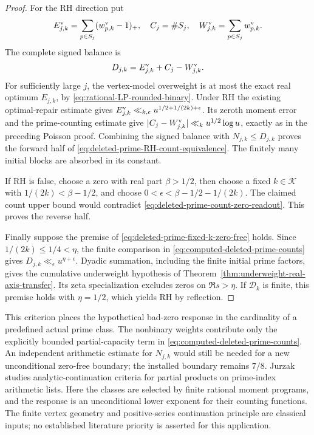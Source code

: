 \documentclass[11pt]{article}
\theoremstyle{definition}
\begin{document}
\begin{proof}
For the RH direction put
\[
 E^{\rm v}_{j,k}
       =\sum_{p\in S_j}(w^{\rm v}_{p,k}-1)_+,\quad
 C_j=\#S_j,\quad W^{\rm v}_{j,k}=\sum_{p\in S_j}w^{\rm v}_{p,k}.
\]
The complete signed balance is
\begin{equation}
 D_{j,k}=E^{\rm v}_{j,k}+C_j-W^{\rm v}_{j,k}.
 \label{eq:deleted-prime-signed-forward-ledger}
\end{equation}
For sufficiently large $j$, the vertex-model overweight
is at most the exact real optimum $E_{j,k}$, by
\eqref{eq:rational-LP-rounded-binary}.
Under RH the existing optimal-repair estimate gives
$E^{\rm v}_{j,k}\ll_{k,\epsilon}u^{1/2+1/(2k)+\epsilon}$.
Its zeroth moment error and the prime-counting estimate
give $|C_j-W^{\rm v}_{j,k}|\ll_k u^{1/2}\log u$, exactly
as in the preceding Poisson proof.
Combining the signed balance with $N_{j,k}\le D_{j,k}$
proves the forward half of
\eqref{eq:deleted-prime-RH-count-equivalence}.
The finitely many initial blocks are absorbed in its constant.

If RH is false, choose a zero with real part $\beta>1/2$,
then choose a fixed $k\in\mathcal K$ with
$1/(2k)<\beta-1/2$, and choose
$0<\epsilon<\beta-1/2-1/(2k)$.
The claimed count upper bound would contradict
\eqref{eq:deleted-prime-count-zero-readout}.
This proves the reverse half.

Finally suppose the premise of
\eqref{eq:deleted-prime-fixed-k-zero-free} holds.
Since $1/(2k)\le1/4<\eta$, the finite comparison in
\eqref{eq:computed-deleted-prime-counts} gives
$D_{j,k}\ll_\epsilon u^{\eta+\epsilon}$.
Dyadic summation, including the finite initial prime factors,
gives the cumulative underweight hypothesis of
Theorem~\ref{thm:underweight-real-axis-transfer}.
Its zeta specialization excludes zeros on $\Re s>\eta$.
If $\mathcal D_k$ is finite, this premise holds with
$\eta=1/2$, which yields RH by reflection.
\end{proof}

This criterion places the hypothetical bad-zero response in
the cardinality of a predefined actual prime class.
The nonbinary weights contribute only the explicitly bounded
partial-capacity term in
\eqref{eq:computed-deleted-prime-counts}.
An independent arithmetic estimate for $N_{j,k}$ would still
be needed for a new unconditional zero-free boundary;
the installed boundary remains $7/8$.
Jurzak~\cite{JurzakPartialEuler} studies analytic-continuation
criteria for partial products on prime-index arithmetic lists.
Here the classes are selected by finite rational moment
programs, and the response is an unconditional lower exponent
for their counting functions. The finite vertex geometry and
positive-series continuation principle are classical inputs;
no established literature priority is asserted for this
application.
\end{document}
